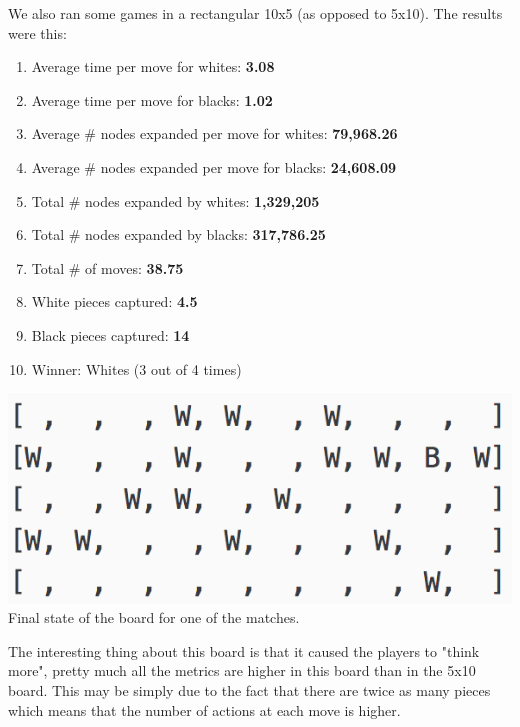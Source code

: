 \documentclass[11pt]{article}
\begin{document}
We also ran some games in a rectangular 10x5 (as opposed to 5x10). The results were this:
\begin{enumerate}
\item Average time per move for whites: \textbf{3.08}
\item Average time per move for blacks: \textbf{1.02}
\item Average \# nodes expanded per move for whites: \textbf{79,968.26}
\item Average \# nodes expanded per move for blacks:  \textbf{24,608.09}
\item Total \# nodes expanded by whites: \textbf{1,329,205}
\item Total \# nodes expanded by blacks: \textbf{317,786.25}
\item Total \# of moves: \textbf{38.75}
\item White pieces captured: \textbf{4.5}
\item Black pieces captured: \textbf{14}
\item Winner: Whites (3 out of 4 times)
\end{enumerate}
\begin{center}
\includegraphics[scale=1]{part2/ab-01-vs-ab-d1-rect5x10.png}\\
Final state of the board for one of the matches.
\end{center}
The interesting thing about this board is that it caused the players to "think more", pretty much all the metrics are higher in this board than in the 5x10 board. This may be simply due to the fact that there are twice as many pieces which means that the number of actions at each move is higher.
\end{document}
